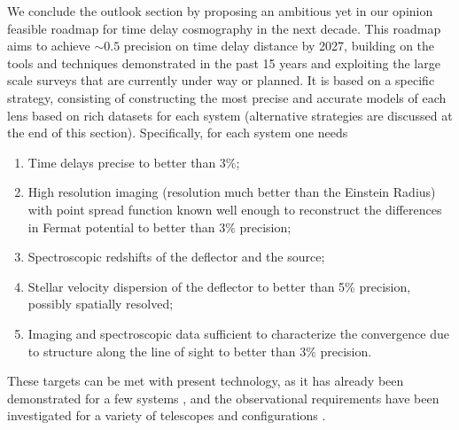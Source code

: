 We conclude the outlook section by proposing an ambitious yet in our
opinion feasible roadmap for time delay cosmography in the next
decade. This roadmap aims to achieve $\sim0.5$ precision on time delay
distance by 2027, building on the tools and techniques demonstrated in
the past 15 years and exploiting the large scale surveys that are
currently under way or planned. It is based on a specific strategy,
consisting of constructing the most precise and accurate models of
each lens based on rich datasets for each system (alternative
strategies are discussed at the end of this section). Specifically,
for each system one needs

\begin{enumerate}
\item Time delays precise to better than $3\%$;
\item High resolution imaging (resolution much better than the Einstein Radius) with point spread function known well enough to reconstruct the differences in Fermat potential to better than $3\%$ precision;
\item Spectroscopic redshifts of the deflector and the source;
\item Stellar velocity dispersion of the deflector to better than 5\% precision, possibly spatially resolved;
\item Imaging and spectroscopic data sufficient to characterize the convergence due to structure along the line of sight to better than $3\%$ precision.
\end{enumerate}

These targets can be met with present technology, as it has already
been demonstrated for a few systems \citep{Tew++13,Suy++13}, and the
observational requirements have been investigated for a variety of
telescopes and configurations
\citep{Gre++13,Collett:2013p34320,Men++15,Lin15}.

